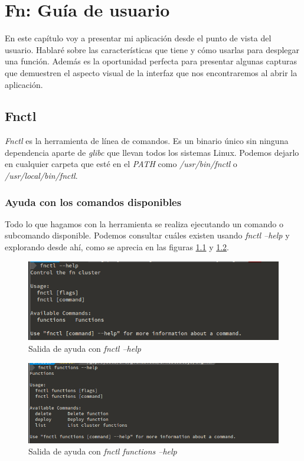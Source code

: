 \chapter{Fn: Guía de usuario}
\label{chap:fn-guia}

En este capítulo voy a presentar mi aplicación desde el punto de vista del usuario. Hablaré sobre las características que tiene y cómo usarlas para desplegar una función. Además es la oportunidad perfecta para presentar algunas capturas que demuestren el aspecto visual de la interfaz que nos encontraremos al abrir la aplicación.

\section{Fnctl}

\emph{Fnctl} es la herramienta de línea de comandos. Es un binario único sin ninguna dependencia aparte de \emph{glibc} que llevan todos los sistemas Linux. Podemos dejarlo en cualquier carpeta que esté en el \emph{PATH} como \emph{/usr/bin/fnctl} o \emph{/usr/local/bin/fnctl}.

\subsection{Ayuda con los comandos disponibles}

Todo lo que hagamos con la herramienta se realiza ejecutando un comando o subcomando disponible. Podemos consultar cuáles existen usando \emph{fnctl --help} y explorando desde ahí, como se aprecia en las figuras \ref{fig:fnctl-help} y \ref{fig:fnctl-help-functions}.

\begin{figure}[H]
    \centering
    \includegraphics[width=\textwidth]{../images/fnctl/help.png}
    \caption{Salida de ayuda con \emph{fnctl --help}}
    \label{fig:fnctl-help}
\end{figure}

\begin{figure}[H]
    \centering
    \includegraphics[width=\textwidth]{../images/fnctl/help-functions.png}
    \caption{Salida de ayuda con \emph{fnctl functions --help}}
    \label{fig:fnctl-help-functions}
\end{figure}

